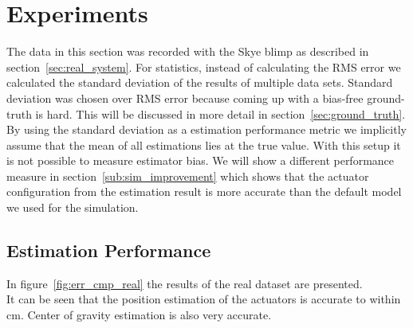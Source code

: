 \section{Experiments}
The data in this section was recorded with the Skye blimp as described in section~\ref{sec:real_system}.
For statistics, instead of calculating the RMS error we calculated the standard deviation of the results of multiple data sets.
Standard deviation was chosen over RMS error because coming up with a bias-free ground-truth is hard.
This will be discussed in more detail in section~\ref{sec:ground_truth}. \\
By using the standard deviation as a estimation performance metric we implicitly assume that the mean of all estimations lies at the true value.
With this setup it is not possible to measure estimator bias.
We will show a different performance measure in section~\ref{sub:sim_improvement} which shows that the actuator configuration from the estimation result is more accurate than the default model we used for the simulation.

\subsection{Estimation Performance}
In figure~\ref{fig:err_cmp_real} the results of the real dataset are presented.\\
It can be seen that the position estimation of the actuators is accurate to within \unit[2]{cm}.
Center of gravity estimation is also very accurate.

